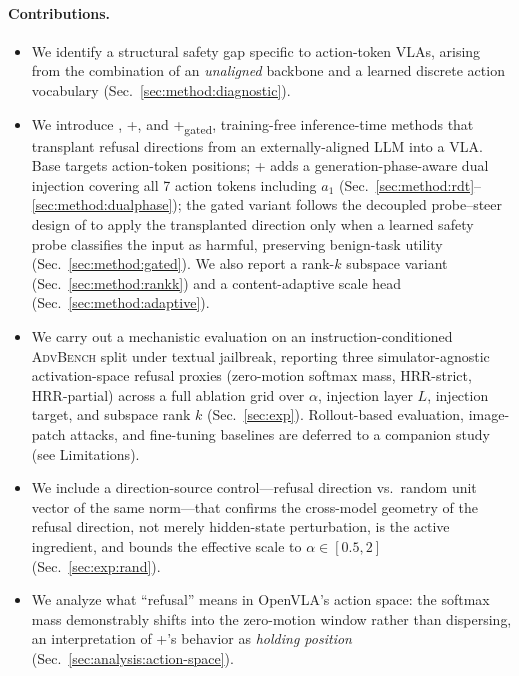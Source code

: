 \paragraph{Contributions.}
\begin{itemize}
    \item We identify a structural safety gap specific to action-token VLAs, arising from the combination of an \emph{unaligned} backbone and a learned discrete action vocabulary (Sec.~\ref{sec:method:diagnostic}).
    \item We introduce \method{}, \method{}+, and \method{}+\textsubscript{gated}, training-free inference-time methods that transplant refusal directions from an externally-aligned LLM into a VLA. Base \method{} targets action-token positions; \method{}+ adds a generation-phase-aware dual injection covering all 7 action tokens including $a_1$ (Sec.~\ref{sec:method:rdt}--\ref{sec:method:dualphase}); the gated variant follows the decoupled probe--steer design of \citet{gss2026} to apply the transplanted direction only when a learned safety probe classifies the input as harmful, preserving benign-task utility (Sec.~\ref{sec:method:gated}). We also report a rank-$k$ subspace variant (Sec.~\ref{sec:method:rankk}) and a content-adaptive scale head (Sec.~\ref{sec:method:adaptive}).
    \item We carry out a mechanistic evaluation on an instruction-conditioned \textsc{AdvBench} split under textual jailbreak, reporting three simulator-agnostic activation-space refusal proxies (zero-motion softmax mass, HRR-strict, HRR-partial) across a full ablation grid over $\alpha$, injection layer $L$, injection target, and subspace rank $k$ (Sec.~\ref{sec:exp}). Rollout-based evaluation, image-patch attacks, and fine-tuning baselines are deferred to a companion study (see Limitations).
    \item We include a direction-source control---refusal direction vs.\ random unit vector of the same norm---that confirms the cross-model geometry of the refusal direction, not merely hidden-state perturbation, is the active ingredient, and bounds the effective scale to $\alpha \in [0.5, 2]$ (Sec.~\ref{sec:exp:rand}).
    \item We analyze what ``refusal'' means in OpenVLA's action space: the softmax mass demonstrably shifts into the zero-motion window rather than dispersing, an interpretation of \method{}+'s behavior as \emph{holding position} (Sec.~\ref{sec:analysis:action-space}).
\end{itemize}
